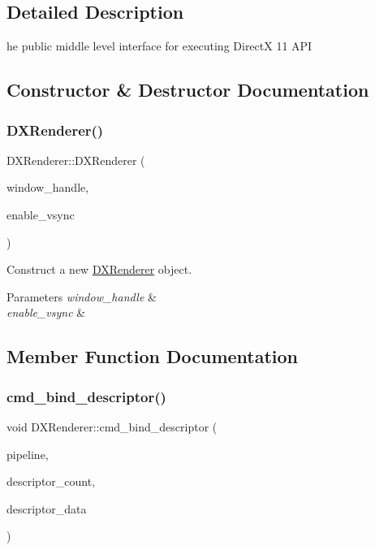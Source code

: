 \subsection{Detailed Description}
he public middle level interface for executing DirectX 11 A\+PI 

\subsection{Constructor \& Destructor Documentation}
\mbox{\label{classDXRenderer_a523a1ab5a6f1031bda1242fb105241b7}} 
\subsubsection{\texorpdfstring{D\+X\+Renderer()}{DXRenderer()}}
{\footnotesize\ttfamily D\+X\+Renderer\+::\+D\+X\+Renderer (\begin{DoxyParamCaption}\item[{H\+W\+ND}]{window\+\_\+handle,  }\item[{bool}]{enable\+\_\+vsync }\end{DoxyParamCaption})}



Construct a new \hyperlink{classDXRenderer}{D\+X\+Renderer} object. 


\begin{DoxyParams}{Parameters}
{\em window\+\_\+handle} & \\
\hline
{\em enable\+\_\+vsync} & \\
\hline
\end{DoxyParams}


\subsection{Member Function Documentation}
\mbox{\label{classDXRenderer_aeed80317a026c96ee333451550d45707}} 
\subsubsection{\texorpdfstring{cmd\+\_\+bind\+\_\+descriptor()}{cmd\_bind\_descriptor()}}
{\footnotesize\ttfamily void D\+X\+Renderer\+::cmd\+\_\+bind\+\_\+descriptor (\begin{DoxyParamCaption}\item[{\hyperlink{classPipeline}{Pipeline} $\ast$}]{pipeline,  }\item[{uint32\+\_\+t}]{descriptor\+\_\+count,  }\item[{\hyperlink{structDescriptorData}{Descriptor\+Data} $\ast$}]{descriptor\+\_\+data }\end{DoxyParamCaption})}



